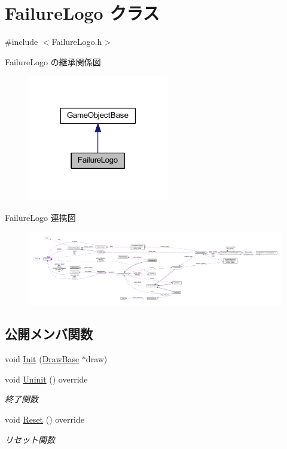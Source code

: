 \hypertarget{class_failure_logo}{}\section{Failure\+Logo クラス}
\label{class_failure_logo}


{\ttfamily \#include $<$Failure\+Logo.\+h$>$}



Failure\+Logo の継承関係図\nopagebreak
\begin{figure}[H]
\begin{center}
\leavevmode
\includegraphics[width=174pt]{class_failure_logo__inherit__graph}
\end{center}
\end{figure}


Failure\+Logo 連携図\nopagebreak
\begin{figure}[H]
\begin{center}
\leavevmode
\includegraphics[width=350pt]{class_failure_logo__coll__graph}
\end{center}
\end{figure}
\subsection*{公開メンバ関数}
\begin{DoxyCompactItemize}
\item 
void \mbox{\hyperlink{class_failure_logo_a22da89def55023f43860cf646da7a74c}{Init}} (\mbox{\hyperlink{class_draw_base}{Draw\+Base}} $\ast$draw)
\item 
void \mbox{\hyperlink{class_failure_logo_adbe01fc4567ade0e788f511f5162299c}{Uninit}} () override
\begin{DoxyCompactList}\small\item\em 終了関数 \end{DoxyCompactList}\item 
void \mbox{\hyperlink{class_failure_logo_a542b1617087a6701f7edb345e2a72e01}{Reset}} () override
\begin{DoxyCompactList}\small\item\em リセット関数 \end{DoxyCompactList}\end{DoxyCompactItemize}
